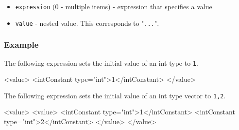 \begin{itemize}
\item {\tt expression} (0 - multiple items) - expression that specifies a value
\item {\tt value} - nested value. This corresponds to "{\tt {...}}".
\end{itemize}

\subsubsection*{Example}

The following expression sets the initial value of an int type to {\tt 1}.
\vspace{2mm}

\begin{CExample}
<value>
  <intConstant type="int">1</intConstant>
</value>
\end{CExample}

The following expression sets the initial value of an int type vector to {\tt {1,2}}.
\vspace{2mm}

\begin{XcodeMLExample}
<value>
  <value>
    <intConstant type="int">1</intConstant>
    <intConstant type="int">2</intConstant>
  </value>
</value>
\end{XcodeMLExample}


